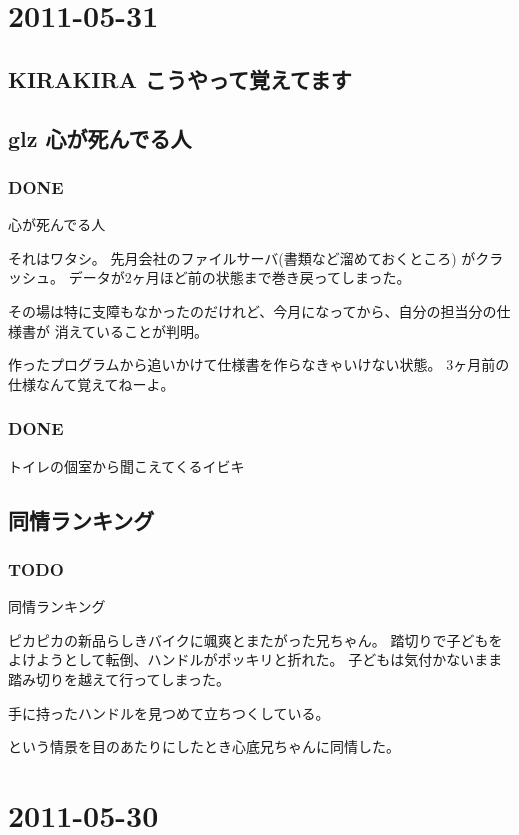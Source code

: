 \documentclass[11pt]{article}
\begin{document}
\section{2011-05-31}
\label{sec-114}
\subsection{KIRAKIRA こうやって覚えてます}
\label{sec-114_1}
\subsection{glz 心が死んでる人}
\label{sec-114_2}
\subsubsection{\textbf{DONE}}
\label{sec-114_2_1}

心が死んでる人

それはワタシ。
先月会社のファイルサーバ(書類など溜めておくところ) がクラッシュ。
データが2ヶ月ほど前の状態まで巻き戻ってしまった。

その場は特に支障もなかったのだけれど、今月になってから、自分の担当分の仕様書が
消えていることが判明。

作ったプログラムから追いかけて仕様書を作らなきゃいけない状態。
3ヶ月前の仕様なんて覚えてねーよ。
\subsubsection{\textbf{DONE}}
\label{sec-114_2_2}

トイレの個室から聞こえてくるイビキ
\subsection{同情ランキング}
\label{sec-114_3}
\subsubsection{\textbf{TODO}}
\label{sec-114_3_1}

同情ランキング

ピカピカの新品らしきバイクに颯爽とまたがった兄ちゃん。
踏切りで子どもをよけようとして転倒、ハンドルがポッキリと折れた。
子どもは気付かないまま踏み切りを越えて行ってしまった。

手に持ったハンドルを見つめて立ちつくしている。

という情景を目のあたりにしたとき心底兄ちゃんに同情した。
\section{2011-05-30}
\label{sec-115}
\end{document}
